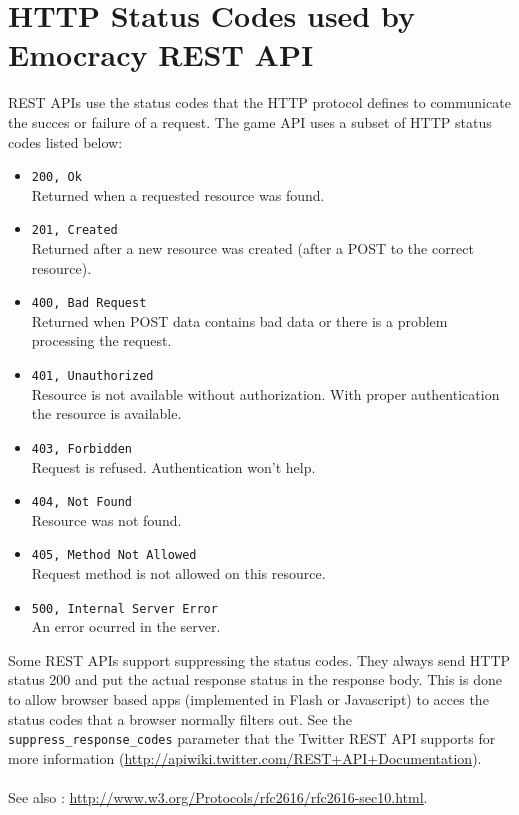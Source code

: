 \documentclass[a4paper]{report}
\begin{document}
\section{HTTP Status Codes used by Emocracy REST API}\label{httpstatuscodes}
REST APIs use the status codes that the HTTP protocol defines to communicate the
succes or failure of a request. The game API uses a subset of HTTP status
codes listed below:
\begin{itemize}
    \item{\texttt{200, Ok}\\
    Returned when a requested resource was found.
    }
    \item{\texttt{201, Created}\\
    Returned after a new resource was created (after a POST to the correct 
    resource).
    }
    \item{\texttt{400, Bad Request}\\
    Returned when POST data contains bad data or there is a problem processing 
    the request.
    }
    \item{\texttt{401, Unauthorized}\\
    Resource is not available without authorization. With proper authentication
    the resource is available.
    }
    \item{\texttt{403, Forbidden}\\
    Request is refused. Authentication won't help.
    }
    \item{\texttt{404, Not Found}\\
    Resource was not found.
    }
    \item{\texttt{405, Method Not Allowed}\\
    Request method is not allowed on this resource.
    }
    \item{\texttt{500, Internal Server Error}\\
    An error ocurred in the server.
    }
\end{itemize}

Some REST APIs support suppressing the status codes. They always send HTTP 
status 200 and put the actual response status in the response body. This is 
done to allow browser based apps (implemented in Flash or Javascript) to acces
the status codes that a browser normally filters out. See the 
\texttt{suppress\_response\_codes} parameter that the Twitter REST API supports
for more information (\mbox{\url{http://apiwiki.twitter.com/REST+API+Documentation}}).\\\\
See also : \mbox{\url{http://www.w3.org/Protocols/rfc2616/rfc2616-sec10.html}.}
\end{document}
